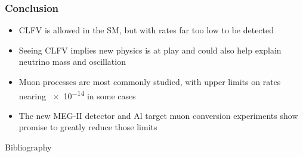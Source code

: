 \documentclass[11pt]{beamer}
\begin{document}
\begin{frame}
    \frametitle{Conclusion}
    \begin{itemize}
        \item CLFV is allowed in the SM, but with rates far too low to be detected
        \item Seeing CLFV implies new physics is at play and could also help explain neutrino mass and oscillation
        \item Muon processes are most commonly studied, with upper limits on rates nearing \num{e-14} in some cases
        \item The new MEG-II detector and Al target muon conversion experiments show promise to greatly reduce those limits
    \end{itemize}
    

\end{frame}

\begin{frame}[allowframebreaks]{Bibliography} 
    \nocite{*}
    
    
\end{frame}
\end{document}
